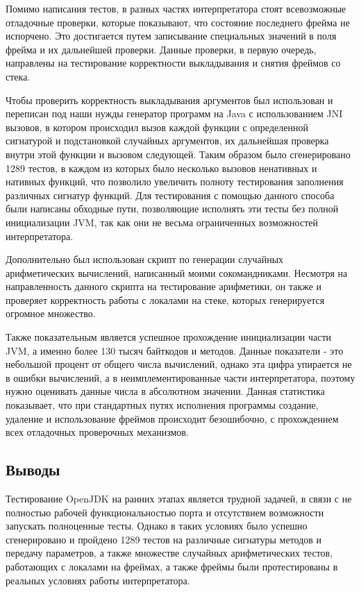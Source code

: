 Помимо написания тестов, в разных частях интерпретатора стоят всевозможные отладочные проверки, которые показывают, что состояние последнего фрейма не испорчено. Это достигается путем записывание специальных значений в поля фрейма и их дальнейшей проверки. Данные проверки, в первую очередь, направлены на тестирование корректности выкладывания и снятия фреймов со стека.

Чтобы проверить корректность выкладывания аргументов был использован и переписан под наши нужды генератор программ на Java с использованием JNI вызовов, в котором происходил вызов каждой функции с определенной сигнатурой и подстановкой случайных аргументов, их дальнейшая проверка внутри этой функции и вызовом следующей. Таким образом было сгенерировано 1289 тестов, в каждом из которых было несколько вызовов ненативных и нативных функций, что позволило увеличить полноту тестирования заполнения различных сигнатур функций. Для тестирования с помощью данного способа были написаны обходные пути, позволяющие исполнять эти тесты без полной инициализации JVM, так как они не весьма ограниченных возможностей интерпретатора.

Дополнительно был использован скрипт по генерации случайных арифметических вычислений, написанный моими сокомандниками. Несмотря на направленность данного скрипта на тестирование арифметики, он также и проверяет корректность работы с локалами на стеке, которых генерируется огромное множество.

Также показательным является успешное прохождение инициализации части JVM, а именно более 130 тысяч байткодов и  методов. Данные показатели - это небольшой процент от общего числа вычислений, однако эта цифра упирается не в ошибки вычислений, а в неимплементированные части интерпретатора, поэтому нужно оценивать данные числа в абсолютном значении. Данная статистика показывает, что при стандартных путях исполнения программы создание, удаление и использование фреймов происходит безошибочно, с прохождением всех отладочных проверочных механизмов.



\subsection{Выводы}

Тестирование OpenJDK на ранних этапах является трудной задачей, в связи с не полностью рабочей функциональностью порта и отсутствием возможности запускать полноценные тесты. Однако в таких условиях было успешно сгенерировано и пройдено 1289 тестов на различные сигнатуры методов и передачу параметров, а также множестве случайных арифметических тестов, работающих с локалами на фреймах, а также фреймы были протестированы в реальных условиях работы интерпретатора.



